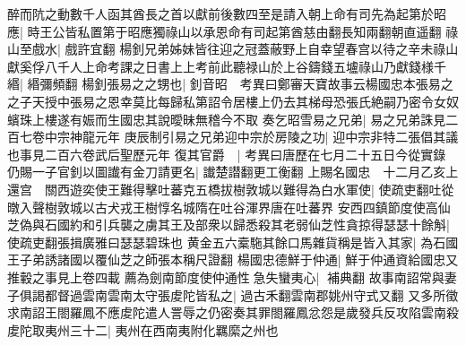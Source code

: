 醉而阬之動數千人函其酋長之首以獻前後數四至是請入朝上命有司先為起第於昭應|{
	時王公皆私置第于昭應獨祿山以承恩命有司起第酋慈由翻長知兩翻朝直遥翻}
祿山至戲水|{
	戲許宜翻}
楊釗兄弟姊妹皆往迎之冠蓋蔽野上自幸望春宫以待之辛未祿山獻奚俘八千人上命考課之日書上上考前此聽禄山於上谷鑄錢五壚祿山乃獻錢様千緡|{
	緡彌頻翻}
楊釗張易之之甥也|{
	釗音昭　考異曰鄭審天寶故事云楊國忠本張易之之子天授中張易之恩幸莫比每歸私第詔令居樓上仍去其梯母恐張氏絶嗣乃密令女奴蠙珠上樓遂有娠而生國忠其說曖昧無稽今不取}
奏乞昭雪易之兄弟|{
	易之兄弟誅見二百七卷中宗神龍元年}
庚辰制引易之兄弟迎中宗於房陵之功|{
	迎中宗非特二張倡其議也事見二百六卷武后聖歷元年}
復其官爵　|{
	考異曰唐歷在七月二十五日今從實錄}
仍賜一子官釗以圖䜟有金刀請更名|{
	䜟楚譛翻更工衡翻}
上賜名國忠　十二月乙亥上還宫　關西遊奕使王難得擊吐蕃克五橋拔樹敦城以難得為白水軍使|{
	使疏吏翻吐從暾入聲樹敦城以古犬戎王樹惇名城隋在吐谷渾界唐在吐蕃界}
安西四鎮節度使高仙芝偽與石國約和引兵襲之虜其王及部衆以歸悉殺其老弱仙芝性貪掠得瑟瑟十餘斛|{
	使疏吏翻張揖廣雅曰瑟瑟碧珠也}
黄金五六槖駞其餘口馬雜貨稱是皆入其家|{
	為石國王子弟誘諸國以覆仙芝之師張本稱尺證翻}
楊國忠德鮮于仲通|{
	鮮于仲通資給國忠又推轂之事見上卷四載}
薦為劍南節度使仲通性急失蠻夷心|{
	補典翻}
故事南詔常與妻子俱謁都督過雲南雲南太守張䖍陀皆私之|{
	過古禾翻雲南郡姚州守式又翻}
又多所徵求南詔王閤羅鳳不應䖍陀遣人詈辱之仍密奏其罪閤羅鳳忿怨是歲發兵反攻陷雲南殺䖍陀取夷州三十二|{
	夷州在西南夷附化羈縻之州也}


